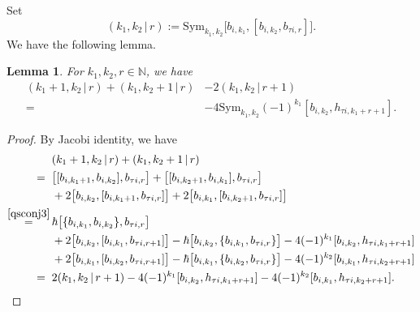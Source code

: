 \documentclass[11pt,reqno]{amsart}
\numberwithin{equation}{section}
\newtheorem{lem}[thm]{Lemma}
\theoremstyle{definition}
\theoremstyle{remark}
\newcommand{\beq}{\begin{equation}}
\newcommand{\eeq}{\end{equation}}
\newcommand{\bN}{\mathbb{N}}
\newcommand{\Sym}{{\mathrm{Sym}}}
\def \h{\hbar}
\def \Sym{\mathrm{Sym}}
\begin{document}
Set
\[
(k_1,k_2\,|\,r):=\Sym_{k_1,k_2}\big[b_{i,k_1},[b_{i,k_2},b_{\tau i,r}]\big].
\]
We have the following lemma.
\begin{lem} For $k_1,k_2,r\in\bN$, we have
\beq\label{ppf1}
\begin{split}
(k_1+1,k_2\,|\,r)+(k_1,k_2+1\,|\,r)&-2(k_1,k_2\,|\,r+1)\\
=&-4\mathrm{Sym}_{k_1,k_2}(-1)^{k_1}[b_{i,k_2},h_{\tau i,k_1+r+1}].
\end{split}
\eeq
\end{lem}
\begin{proof}
By Jacobi identity, we have
\begin{align*}
&(k_1+1,k_2\,|\,r)+(k_1,k_2+1\,|\,r)\\
=\hskip0.2cm & \big[[b_{i,k_1+1},b_{i,k_2}],b_{\tau i,r}\big]+\big[[b_{i,k_2+1},b_{i,k_1}],b_{\tau i,r}\big]\\
&+2\big[b_{i,k_2},[b_{i,k_1+1},b_{\tau i,r}]\big]+2\big[b_{i,k_1},[b_{i,k_2+1},b_{\tau i,r}]\big]\\
\stackrel{\eqref{qsconj3}}{=}\,  & \h\big[\{b_{i,k_1},b_{i,k_2}\},b_{\tau i,r}\big]\\
&+2\big[b_{i,k_2},[b_{i,k_1},b_{\tau i,r+1}]\big]-\h\big[b_{i,k_2},\{b_{i,k_1},b_{\tau i,r}\}\big]-4(-1)^{k_1}[b_{i,k_2},h_{\tau i,k_1+r+1}]\\&+2\big[b_{i,k_1},[b_{i,k_2},b_{\tau i,r+1}]\big]-\h\big[b_{i,k_1},\{b_{i,k_2},b_{\tau i,r}\}\big]-4(-1)^{k_2}[b_{i,k_1},h_{\tau i,k_2+r+1}]\\
=\hskip0.2cm & 2(k_1,k_2\,|\,r+1)-4(-1)^{k_1}[b_{i,k_2},h_{\tau i,k_1+r+1}]-4(-1)^{k_2}[b_{i,k_1},h_{\tau i,k_2+r+1}].\qedhere
\end{align*}
\end{proof}
\end{document}
